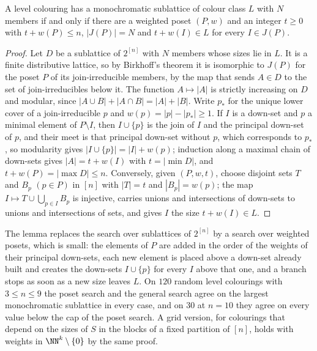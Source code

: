 \begin{lemma}\label{lem:levelposet}
A level colouring has a monochromatic sublattice of colour class $L$ with $N$ members if and only if there are a weighted poset $(P,w)$ and an integer $t\ge0$ with $t+w(P)\le n$, $|J(P)|=N$ and $t+w(I)\in L$ for every $I\in J(P)$.
\end{lemma}

\begin{proof}
Let $D$ be a sublattice of $2^{[n]}$ with $N$ members whose sizes lie in $L$. It is a finite distributive lattice, so by Birkhoff's theorem it is isomorphic to $J(P)$ for the poset $P$ of its join-irreducible members, by the map that sends $A\in D$ to the set of join-irreducibles below it. The function $A\mapsto|A|$ is strictly increasing on $D$ and modular, since $|A\cup B|+|A\cap B|=|A|+|B|$. Write $p_{*}$ for the unique lower cover of a join-irreducible $p$ and $w(p)=|p|-|p_{*}|\ge1$. If $I$ is a down-set and $p$ a minimal element of $P\setminus I$, then $I\cup\{p\}$ is the join of $I$ and the principal down-set of $p$, and their meet is that principal down-set without $p$, which corresponds to $p_{*}$, so modularity gives $|I\cup\{p\}|=|I|+w(p)$; induction along a maximal chain of down-sets gives $|A|=t+w(I)$ with $t=|\min D|$, and $t+w(P)=|\max D|\le n$. Conversely, given $(P,w,t)$, choose disjoint sets $T$ and $B_{p}$ $(p\in P)$ in $[n]$ with $|T|=t$ and $|B_{p}|=w(p)$; the map $I\mapsto T\cup\bigcup_{p\in I}B_{p}$ is injective, carries unions and intersections of down-sets to unions and intersections of sets, and gives $I$ the size $t+w(I)\in L$.
\end{proof}

The lemma replaces the search over sublattices of $2^{[n]}$ by a search over weighted posets, which is small: the elements of $P$ are added in the order of the weights of their principal down-sets, each new element is placed above a down-set already built and creates the down-sets $I\cup\{p\}$ for every $I$ above that one, and a branch stops as soon as a new size leaves $L$. On $120$ random level colourings with $3\le n\le9$ the poset search and the general search agree on the largest monochromatic sublattice in every case, and on $30$ at $n=10$ they agree on every value below the cap of the poset search. A grid version, for colourings that depend on the sizes of $S$ in the blocks of a fixed partition of $[n]$, holds with weights in $\NN^{k}\setminus\{0\}$ by the same proof.

